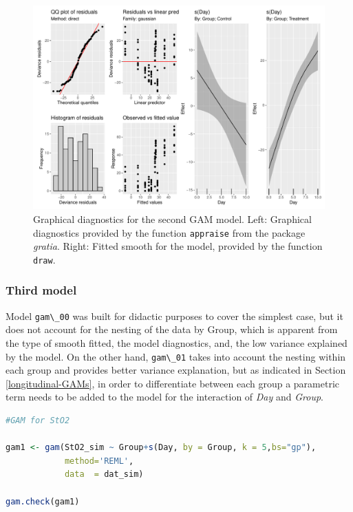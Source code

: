 \documentclass[
]{article}
\newcommand{\passthrough}[1]{#1}
\begin{document}
\begin{figure}[H]

{\centering \includegraphics[width=0.75\linewidth,]{Full_document_files/figure-latex/second-GAM-diag-1} 

}

\caption{Graphical diagnostics for the second GAM model. Left: Graphical diagnostics provided by the function \passthrough{\lstinline!appraise!} from the package \emph{gratia}. Right: Fitted smooth for the model, provided by the function \passthrough{\lstinline!draw!}.}\label{fig:second-GAM-diag}
\end{figure}

\hypertarget{third-model}{%
\subsubsection{Third model}\label{third-model}}

Model \passthrough{\lstinline!gam\_00!} was built for didactic purposes to cover the simplest case, but it does not account for the nesting of the data by Group, which is apparent from the type of smooth fitted, the model diagnostics, and, the low variance explained by the model. On the other hand, \passthrough{\lstinline!gam\_01!} takes into account the nesting within each group and provides better variance explanation, but as indicated in Section \ref{longitudinal-GAMs}, in order to differentiate between each group a parametric term needs to be added to the model for the interaction of \emph{Day} and \emph{Group}.

\begin{lstlisting}[language=R]
#GAM for StO2

gam1 <- gam(StO2_sim ~ Group+s(Day, by = Group, k = 5,bs="gp"),
            method='REML',
            data  = dat_sim)

gam.check(gam1)
\end{lstlisting}
\end{document}
